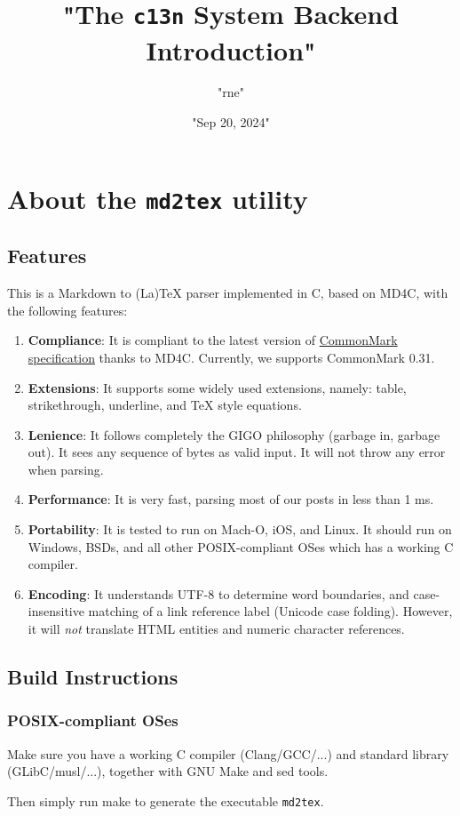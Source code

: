 \title{"The \texttt{c13n} System Backend Introduction"}
\author{"rne"}
\date{"Sep 20, 2024"}
\maketitle
\chapter{About the \texttt{md2tex} utility}
\section{Features}
This is a Markdown to (La)TeX parser implemented in C, based on MD4C, with the following features:\par
\begin{enumerate}
\item \textbf{Compliance}: It is compliant to the latest version of \href{http://spec.commonmark.org/}{CommonMark specification} thanks to MD4C. Currently, we supports CommonMark 0.31.
\item \textbf{Extensions}: It supports some widely used extensions, namely: table, strikethrough, underline, and TeX style equations.
\item \textbf{Lenience}: It follows completely the GIGO philosophy (garbage in, garbage out). It sees any sequence of bytes as valid input. It will not throw any error when parsing.
\item \textbf{Performance}: It is very fast, parsing most of our posts in less than 1 ms.
\item \textbf{Portability}: It is tested to run on Mach-O, iOS, and Linux. It should run on Windows, BSDs, and all other POSIX-compliant OSes which has a working C compiler.
\item \textbf{Encoding}: It understands UTF-8 to determine word boundaries, and case-insensitive matching of a link reference label (Unicode case folding). However, it will \textit{not} translate HTML entities and numeric character references.
\end{enumerate}
\section{Build Instructions}
\subsection{POSIX-compliant OSes}
Make sure you have a working C compiler (Clang/GCC/...) and standard library (GLibC/musl/...), together with GNU Make and sed tools.\par
Then simply run make to generate the executable \verb!md2tex!.\par
